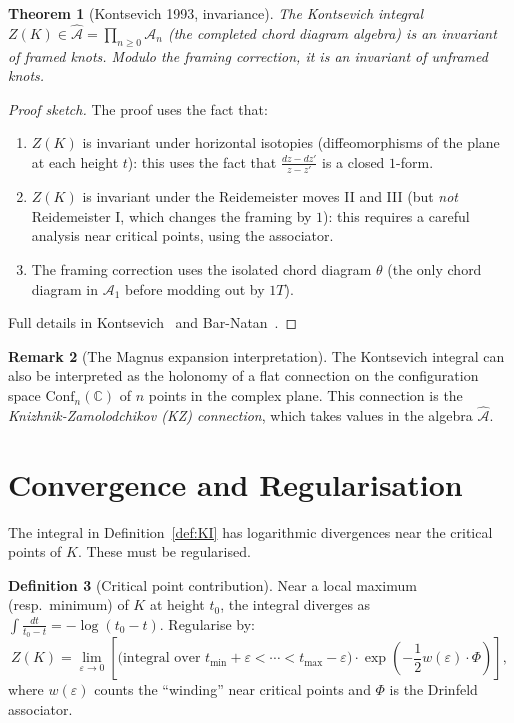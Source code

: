 \documentclass[12pt,a4paper]{amsart}
\newtheorem{theorem}{Theorem}[section]
\theoremstyle{definition}
\newtheorem{definition}[theorem]{Definition}
\newtheorem{remark}[theorem]{Remark}
\newcommand{\C}{\mathbb{C}}
\newcommand{\Ac}{\mathcal{A}}
\begin{document}
\begin{theorem}[Kontsevich 1993, invariance]\label{thm:KI_invariant}
The Kontsevich integral $Z(K) \in \hat{\mathcal{A}} = \prod_{n \geq 0} \mathcal{A}_n$
(the completed chord diagram algebra) is an invariant of framed knots.
Modulo the framing correction, it is an invariant of unframed knots.
\end{theorem}

\begin{proof}[Proof sketch]
The proof uses the fact that:
\begin{enumerate}[label=(\arabic*)]
  \item $Z(K)$ is invariant under horizontal isotopies (diffeomorphisms of
        the plane at each height $t$): this uses the fact that
        $\frac{dz - dz'}{z - z'}$ is a closed $1$-form.
  \item $Z(K)$ is invariant under the Reidemeister moves II and III (but
        \emph{not} Reidemeister I, which changes the framing by $1$): this
        requires a careful analysis near critical points, using the associator.
  \item The framing correction uses the isolated chord diagram $\theta$
        (the only chord diagram in $\Ac_1$ before modding out by $1T$).
\end{enumerate}
Full details in Kontsevich~\cite{kontsevich1993} and Bar-Natan~\cite{barnatan1995}.
\end{proof}

\begin{remark}[The Magnus expansion interpretation]
The Kontsevich integral can also be interpreted as the holonomy of a flat
connection on the configuration space $\mathrm{Conf}_n(\C)$ of $n$ points
in the complex plane.  This connection is the \emph{Knizhnik-Zamolodchikov
(KZ) connection}, which takes values in the algebra $\hat{\mathcal{A}}$.
\end{remark}

\section{Convergence and Regularisation}\label{sec:convergence}

The integral in Definition~\ref{def:KI} has logarithmic divergences near
the critical points of $K$.  These must be regularised.

\begin{definition}[Critical point contribution]
Near a local maximum (resp.\ minimum) of $K$ at height $t_0$, the integral
diverges as $\int \frac{dt}{t_0 - t} = -\log(t_0 - t)$.  Regularise by:
\[
  Z(K) = \lim_{\varepsilon \to 0} \left[
    \text{(integral over } t_{\min}+\varepsilon < \cdots < t_{\max}-\varepsilon)
    \cdot \exp\!\left(-\frac{1}{2} w(\varepsilon) \cdot \Phi\right)
  \right],
\]
where $w(\varepsilon)$ counts the ``winding'' near critical points and
$\Phi$ is the Drinfeld associator.
\end{definition}
\end{document}
